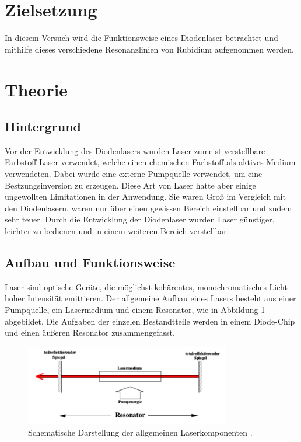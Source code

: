 \section{Zielsetzung}
\label{sec:Zielsetzung}
In diesem Versuch wird die Funktionsweise eines Diodenlaser betrachtet und
mithilfe dieses verschiedene Resonanzlinien von Rubidium aufgenommen werden.

\section{Theorie}
\label{sec:Theorie}

\subsection{Hintergrund}
Vor der Entwicklung des Diodenlasers wurden Laser zumeist verstellbare Farbstoff-Laser
verwendet, welche einen chemischen Farbstoff als aktives Medium verwendeten.
Dabei wurde eine externe Pumpquelle verwendet, um eine Bestzungsinversion zu
erzeugen. Diese Art von Laser hatte aber einige ungewollten Limitationen in
der Anwendung. Sie waren Groß im Vergleich mit den Diodenlasern, waren nur über
einen gewissen Bereich einstellbar und zudem sehr teuer. Durch die Entwicklung
der Diodenlaser wurden Laser günstiger, leichter zu bedienen und in einem weiteren
Bereich verstellbar.

\subsection{Aufbau und Funktionsweise}
Laser sind optische Geräte, die möglichst kohärentes, monochromatisches Licht
hoher Intensität emittieren.
Der allgemeine Aufbau eines Lasers besteht aus einer Pumpquelle, ein Lasermedium
und einem Resonator, wie in Abbildung \ref{fig:laser} abgebildet.
Die Aufgaben der einzelen Bestandtteile werden in einem Diode-Chip und einen
äußeren Resonator zusammengefasst.

\begin{figure}[htb]
  \centering
  \includegraphics[width=0.8\textwidth]{images/V61.pdf}
  \caption{Schematische Darstellung der allgemeinen Laserkomponenten \cite{anleitung2}.}
  \label{fig:laser}
\end{figure}

